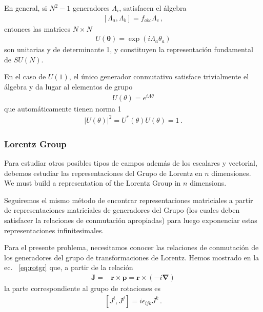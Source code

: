 En general, si $N^{2}-1$ generadores $\Lambda_i$, satisfacen el álgebra
\begin{align}
  \left[ \Lambda_a,\Lambda_b \right]=f_{abc}\Lambda_{c}\,,
\end{align}
entonces las matrices $N\times N$ 
\begin{align}
  U(\boldsymbol{\theta})=\exp\left( i \Lambda_{a}\theta_{a} \right)
\end{align}
son unitarias y de determinante 1, y constituyen la representación fundamental de $SU(N)$.

En el caso de $U(1)$, el único generador conmutativo satisface trivialmente el álgebra y da lugar al elementos de grupo
\begin{align}
  U(\theta)=e^{i\Lambda \theta}
\end{align}
que automáticamente tienen norma 1
\begin{align*}
|U(\theta)|^2= U^{*}(\theta)U(\theta)=1\,.
\end{align*}


\subsubsection{Lorentz Group}
Para estudiar otros posibles tipos de campos además de los escalares y vectorial, debemos estudiar las representaciones del Grupo de Lorentz en $n$ dimensiones. 
We must build a representation of the Lorentz Group in  $n$ dimensions. 

Seguiremos el mismo método de encontrar representaciones matriciales a partir de representaciones matriciales de generadores del Grupo (los cuales deben satisfacer la relaciones de conmutación apropiadas) para luego exponenciar estas representaciones infinitesimales.

Para el presente problema, necesitamos conocer las relaciones de conmutación de los generadores del grupo de transformaciones de Lorentz. Hemos mostrado en la ec.~ \eqref{eq:rotgr}  que, a partir de la relación
\begin{align}
\label{eq:rxp}
  \mathbf{J}=&\mathbf{r}\times \mathbf{p}=\mathbf{r}\times (-i\boldsymbol{\nabla})
\end{align}
la parte correspondiente al grupo de rotaciones es
\begin{align*}
  \left[J^i,J^j\right]=i\epsilon_{ijk}J^k\,.
\end{align*}



